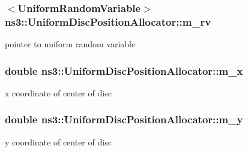 \subsubsection[{\texorpdfstring{m\+\_\+rv}{m_rv}}]{$<${\bf Uniform\+Random\+Variable}$>$ ns3\+::\+Uniform\+Disc\+Position\+Allocator\+::m\+\_\+rv\hspace{0.3cm}{\ttfamily [private]}}\hypertarget{classns3_1_1UniformDiscPositionAllocator_ac80294641fed4793385d7ca6a126f2f8}{}\label{classns3_1_1UniformDiscPositionAllocator_ac80294641fed4793385d7ca6a126f2f8}


pointer to uniform random variable 

\subsubsection[{\texorpdfstring{m\+\_\+x}{m_x}}]{\setlength{\rightskip}{0pt plus 5cm}double ns3\+::\+Uniform\+Disc\+Position\+Allocator\+::m\+\_\+x\hspace{0.3cm}{\ttfamily [private]}}\hypertarget{classns3_1_1UniformDiscPositionAllocator_a75d18640eddf7d54a13e8aba70af7c05}{}\label{classns3_1_1UniformDiscPositionAllocator_a75d18640eddf7d54a13e8aba70af7c05}


x coordinate of center of disc 

\subsubsection[{\texorpdfstring{m\+\_\+y}{m_y}}]{\setlength{\rightskip}{0pt plus 5cm}double ns3\+::\+Uniform\+Disc\+Position\+Allocator\+::m\+\_\+y\hspace{0.3cm}{\ttfamily [private]}}\hypertarget{classns3_1_1UniformDiscPositionAllocator_aa40b9a3c579a9993ca67f20a82a8d1f5}{}\label{classns3_1_1UniformDiscPositionAllocator_aa40b9a3c579a9993ca67f20a82a8d1f5}


y coordinate of center of disc 

